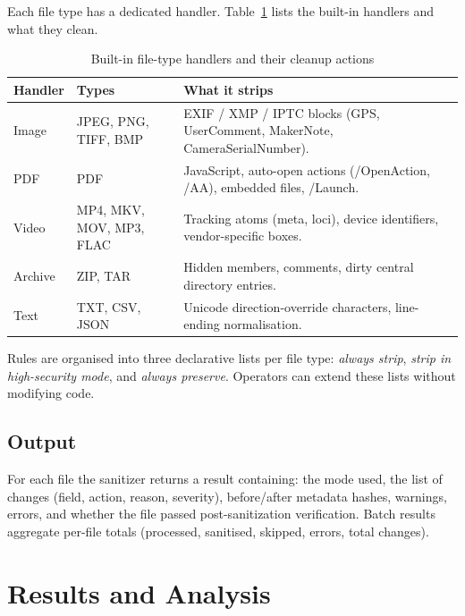 \documentclass[12pt, a4paper]{report}
\begin{document}
Each file type has a dedicated handler. Table~\ref{tab:handlers} lists
the built-in handlers and what they clean.

\begin{table}[H]
\centering
\caption{Built-in file-type handlers and their cleanup actions}
\label{tab:handlers}
\begin{tabular}{|l|l|p{7cm}|}
\hline
\textbf{Handler} & \textbf{Types} & \textbf{What it strips} \\
\hline
Image & JPEG, PNG, TIFF, BMP & EXIF / XMP / IPTC blocks (GPS, UserComment, MakerNote, CameraSerialNumber). \\
\hline
PDF & PDF & JavaScript, auto-open actions (/OpenAction, /AA), embedded files, /Launch. \\
\hline
Video & MP4, MKV, MOV, MP3, FLAC & Tracking atoms (meta, loci), device identifiers, vendor-specific boxes. \\
\hline
Archive & ZIP, TAR & Hidden members, comments, dirty central directory entries. \\
\hline
Text & TXT, CSV, JSON & Unicode direction-override characters, line-ending normalisation. \\
\hline
\end{tabular}
\end{table}

Rules are organised into three declarative lists per file type:
\emph{always strip}, \emph{strip in high-security mode}, and
\emph{always preserve}. Operators can extend these lists without
modifying code.

\section{Output}

For each file the sanitizer returns a result containing: the mode used,
the list of changes (field, action, reason, severity), before/after
metadata hashes, warnings, errors, and whether the file passed
post-sanitization verification. Batch results aggregate per-file totals
(processed, sanitised, skipped, errors, total changes).

\cleardoublepage


\chapter{Results and Analysis}
\label{chap:results}
\end{document}
